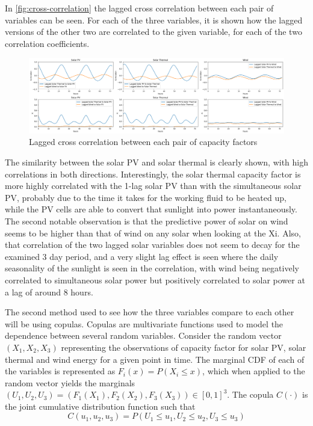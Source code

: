 In \autoref{fig:cross-correlation} the lagged cross correlation between each pair of variables can be seen. For each of the three variables, it is shown how the lagged versions of the other two are correlated to the given variable, for each of the two correlation coefficients. 

\begin{figure}[ht]
    \centering
    \captionsetup{justification=centering}
    \includegraphics[width=\linewidth]{assets/cross-correlation.png}
    \caption{Lagged cross correlation between each pair of capacity factors}
    \label{fig:cross-correlation}
\end{figure}

The similarity between the solar PV and solar thermal is clearly shown, with high correlations in both directions. Interestingly, the solar thermal capacity factor is more highly correlated with the 1-lag solar PV than with the simultaneous solar PV, probably due to the time it takes for the working fluid to be heated up, while the PV cells are able to convert that sunlight into power instantaneously. The second notable observation is that the predictive power of solar on wind seems to be higher than that of wind on any solar when looking at the Xi. Also, that correlation of the two lagged solar variables does not seem to decay for the examined 3 day period, and a very slight lag effect is seen where the daily seasonality of the sunlight is seen in the correlation, with wind being negatively correlated to simultaneous solar power but positively correlated to solar power at a lag of around 8 hours. 


The second method used to see how the three variables compare to each other will be using copulas. Copulas are multivariate functions used to model the dependence between several random variables. Consider the random vector $(X_1,X_2,X_3)$ representing the observations of capacity factor for solar PV, solar thermal and wind energy for a given point in time. The marginal CDF of each of the variables is represented as $F_i\left(x\right)=P\left(X_i\leq x\right)$, which when applied to the random vector yields the marginals $\left(U_1,U_2,U_3\right)=\left(F_1\left(X_1\right),F_2\left(X_2\right),F_3\left(X_3\right)\right)\in \left[0,1\right]^3$. The copula $C(\cdot)$ is the joint cumulative distribution function such that 
\begin{equation}
    C\left(u_1,u_2,u_3\right)=P\left(U_1\leq u_1,U_2\leq u_2,U_3\leq u_3\right)
\end{equation}

